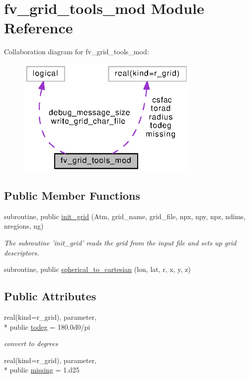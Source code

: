 \section{fv\-\_\-grid\-\_\-tools\-\_\-mod Module Reference}
\label{classfv__grid__tools__mod}


Collaboration diagram for fv\-\_\-grid\-\_\-tools\-\_\-mod\-:
\nopagebreak
\begin{figure}[H]
\begin{center}
\leavevmode
\includegraphics[width=249pt]{classfv__grid__tools__mod__coll__graph}
\end{center}
\end{figure}
\subsection*{Public Member Functions}
\begin{DoxyCompactItemize}
\item 
subroutine, public \hyperlink{classfv__grid__tools__mod_ad44c07c95a2f28e62399da37867817a4}{init\-\_\-grid} (Atm, grid\-\_\-name, grid\-\_\-file, npx, npy, npz, ndims, nregions, ng)
\begin{DoxyCompactList}\small\item\em The subroutine 'init\-\_\-grid' reads the grid from the input file and sets up grid descriptors. \end{DoxyCompactList}\item 
subroutine, public \hyperlink{classfv__grid__tools__mod_a3b343a8e46f50390dadd2b6fddabf244}{spherical\-\_\-to\-\_\-cartesian} (lon, lat, r, x, y, z)
\end{DoxyCompactItemize}
\subsection*{Public Attributes}
\begin{DoxyCompactItemize}
\item 
real(kind=r\-\_\-grid), parameter, \\*
public \hyperlink{classfv__grid__tools__mod_a8b3bcc75f621d290a7cfa0b736983e3f}{todeg} = 180.\-0d0/pi
\begin{DoxyCompactList}\small\item\em convert to degrees \end{DoxyCompactList}\item 
real(kind=r\-\_\-grid), parameter, \\*
public \hyperlink{classfv__grid__tools__mod_acb906ec796b589b9fb688bbbe1bee3c8}{missing} = 1.d25
\end{DoxyCompactItemize}

